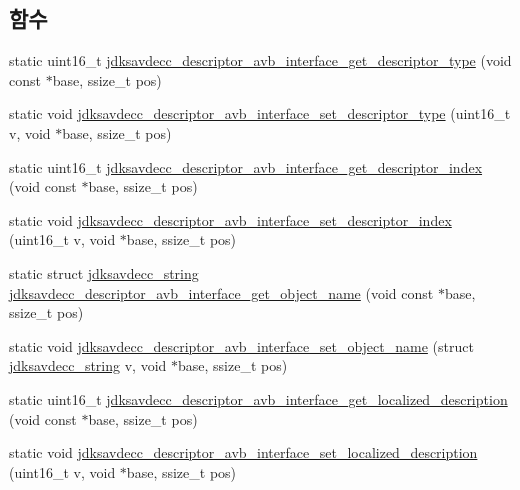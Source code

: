 \subsection*{함수}
\begin{DoxyCompactItemize}
\item 
static uint16\+\_\+t \hyperlink{group__descriptor__avb__interface_ga1c64d652a2c9adfc7d6a1ac0ef7cacf6}{jdksavdecc\+\_\+descriptor\+\_\+avb\+\_\+interface\+\_\+get\+\_\+descriptor\+\_\+type} (void const $\ast$base, ssize\+\_\+t pos)
\item 
static void \hyperlink{group__descriptor__avb__interface_ga3d003a2b8e5f29cefdcc60ad35d45aae}{jdksavdecc\+\_\+descriptor\+\_\+avb\+\_\+interface\+\_\+set\+\_\+descriptor\+\_\+type} (uint16\+\_\+t v, void $\ast$base, ssize\+\_\+t pos)
\item 
static uint16\+\_\+t \hyperlink{group__descriptor__avb__interface_ga0473b9e480558f799641f95d41ffb3ed}{jdksavdecc\+\_\+descriptor\+\_\+avb\+\_\+interface\+\_\+get\+\_\+descriptor\+\_\+index} (void const $\ast$base, ssize\+\_\+t pos)
\item 
static void \hyperlink{group__descriptor__avb__interface_gad49d78b1b367aa029466ed34863ad480}{jdksavdecc\+\_\+descriptor\+\_\+avb\+\_\+interface\+\_\+set\+\_\+descriptor\+\_\+index} (uint16\+\_\+t v, void $\ast$base, ssize\+\_\+t pos)
\item 
static struct \hyperlink{structjdksavdecc__string}{jdksavdecc\+\_\+string} \hyperlink{group__descriptor__avb__interface_gae840cc23667c9361f7d14a3d9c55c2f6}{jdksavdecc\+\_\+descriptor\+\_\+avb\+\_\+interface\+\_\+get\+\_\+object\+\_\+name} (void const $\ast$base, ssize\+\_\+t pos)
\item 
static void \hyperlink{group__descriptor__avb__interface_ga726447a0fd154e4b5d5487e308c915aa}{jdksavdecc\+\_\+descriptor\+\_\+avb\+\_\+interface\+\_\+set\+\_\+object\+\_\+name} (struct \hyperlink{structjdksavdecc__string}{jdksavdecc\+\_\+string} v, void $\ast$base, ssize\+\_\+t pos)
\item 
static uint16\+\_\+t \hyperlink{group__descriptor__avb__interface_ga679b329f1e2a503e0118e19743ca2c7b}{jdksavdecc\+\_\+descriptor\+\_\+avb\+\_\+interface\+\_\+get\+\_\+localized\+\_\+description} (void const $\ast$base, ssize\+\_\+t pos)
\item 
static void \hyperlink{group__descriptor__avb__interface_ga858ae013ca91a5aa98b59ccd67ecdeeb}{jdksavdecc\+\_\+descriptor\+\_\+avb\+\_\+interface\+\_\+set\+\_\+localized\+\_\+description} (uint16\+\_\+t v, void $\ast$base, ssize\+\_\+t pos)
\item 

\end{DoxyCompactItemize}
